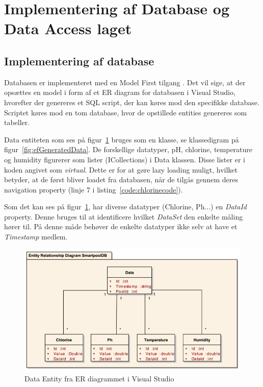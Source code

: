 \section{Implementering af Database og Data Access laget}

\subsection{Implementering af database}

Databasen er implementeret med en Model First tilgang \cite{microsoftdatadevelopercenter2016}. Det vil sige, at der opsættes en model i form af et ER diagram for databasen i Visual Studio, hvorefter der genereres et SQL script, der kan køres mod den specifikke database. Scriptet køres mod en tom database, hvor de opstillede entities genereres som tabeller.

Data entiteten som ses på figur~\ref{fig:datasetentity} bruges som en klasse, se klassedigram på figur~\ref{fig:efGeneratedData}. De forskellige datatyper, pH, chlorine, temperature og humidity figurerer som lister (ICollections) i Data klassen. Disse lister er i koden angivet som \textit{virtual}. Dette er for at gøre lazy loading muligt, hvilket betyder, at de først bliver loadet fra databasen, når de tilgås gennem deres navigation property \cite{microsoftdevelopernetwork2016} (linje 7 i listing~\ref{code:chlorinecode}).

Som det kan ses på figur~\ref{fig:datasetentity}, har diverse datatyper (Chlorine, Ph...) en \textit{DataId} property. Denne bruges til at identificere hvilket \textit{DataSet} den enkelte måling hører til. På denne måde behøver de enkelte datatyper ikke selv at have et \textit{Timestamp} medlem. 

\begin{figure}[h]
	\centering
	\includegraphics[width=0.8\linewidth]{figs/implementering/datasetentity.png}
	\caption{Data Entity fra ER diagrammet i Visual Studio}
	\label{fig:datasetentity}
\end{figure}


